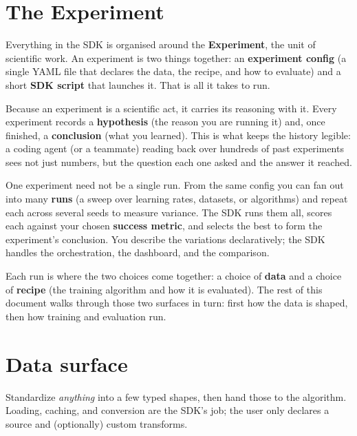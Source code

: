 \documentclass[11pt]{article}
\begin{document}
\section{The Experiment}

Everything in the SDK is organised around the \textbf{Experiment}, the unit
of scientific work. An experiment is two things together: an \textbf{experiment
config} (a single YAML file that declares the data, the recipe, and how to
evaluate) and a short \textbf{SDK script} that launches it. That is all it takes
to run.

Because an experiment is a scientific act, it carries its reasoning with it.
Every experiment records a \textbf{hypothesis} (the reason you are running
it) and, once finished, a \textbf{conclusion} (what you learned). This is
what keeps the history legible: a coding agent (or a teammate) reading back over
hundreds of past experiments sees not just numbers, but the question each one
asked and the answer it reached.

One experiment need not be a single run. From the same config you can fan out
into many \textbf{runs} (a sweep over learning rates, datasets, or
algorithms) and repeat each across several seeds to measure variance. The SDK
runs them all, scores each against your chosen \textbf{success metric}, and
selects the best to form the experiment's conclusion. You describe the
variations declaratively; the SDK handles the orchestration, the dashboard, and
the comparison.

Each run is where the two choices come together: a choice of \textbf{data} and a
choice of \textbf{recipe} (the training algorithm and how it is evaluated). The
rest of this document walks through those two surfaces in turn: first how the
data is shaped, then how training and evaluation run.

\section{Data surface}

Standardize \emph{anything} into a few typed shapes, then hand those to the
algorithm. Loading, caching, and conversion are the SDK's job; the user only
declares a source and (optionally) custom transforms.
\end{document}
